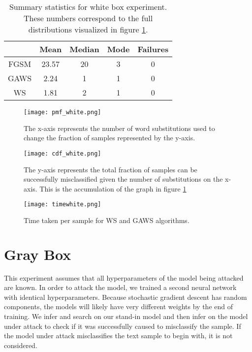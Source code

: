 \begin{table}
\centering
\begin{tabular}{ |c|c|c|c|c| } \hline
& Mean & Median & Mode & Failures\\ \hline
FGSM & 23.57 & 20 & 3 & 0\\ \hline
GAWS & 2.24 & 1 & 1 & 0\\ \hline
WS & 1.81 & 2 & 1 & 0\\ \hline
\end{tabular}
\caption{Summary statistics for white box experiment.  These numbers correspond to the full distributions visualized in figure \ref{fig:whitepmf}.}
\label{tab:whitesum}
\end{table}
\begin{figure}
    \centering
    \texttt{[image: pmf\_white.png]}
    \caption{The x-axis represents the number of word substitutions used to change the fraction of samples represented by the y-axis.}
    \label{fig:whitepmf}
\end{figure}

\begin{figure}
    \centering
    \texttt{[image: cdf\_white.png]}
    \caption{The y-axis represents the total fraction of samples can be successfully misclassified given the number of substitutions on the x-axis.  This is the accumulation of the graph in figure \ref{fig:whitepmf}}
    \label{fig:whitecdf}
\end{figure}

\begin{figure}
    \centering
    \texttt{[image: timewhite.png]}
    \caption{Time taken per sample for WS and GAWS algorithms.}
    \label{fig:whitetime}
\end{figure}

\section{Gray Box}
This experiment assumes that all hyperparameters of the model being attacked are known.  In order to attack the model, we trained a second neural network with identical hyperparameters.  Because stochastic gradient descent has random components, the models will likely have very different weights by the end of training.  We infer and search on our stand-in model and then infer on the model under attack to check if it was successfully caused to misclassify the sample.  If the model under attack misclassifies the text sample to begin with, it is not considered.

